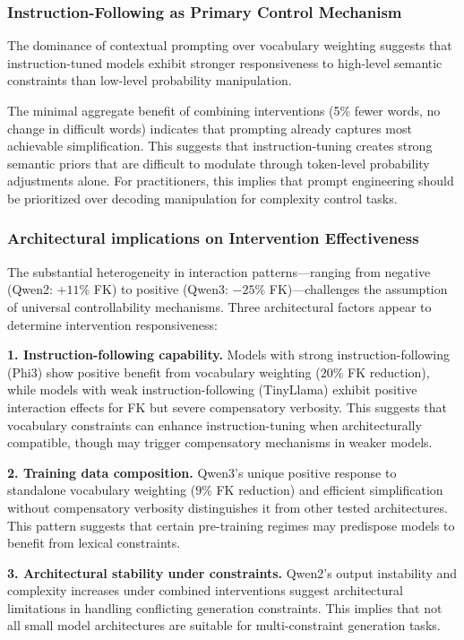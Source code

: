 \documentclass[10pt, a4paper]{article}
\begin{document}
\subsubsection{Instruction-Following as Primary Control Mechanism}

The dominance of contextual prompting over vocabulary weighting suggests that instruction-tuned models exhibit stronger responsiveness to high-level semantic constraints than low-level probability manipulation.

The minimal aggregate benefit of combining interventions (5\% fewer words, no change in difficult words) indicates that prompting already captures most achievable simplification. This suggests that instruction-tuning creates strong semantic priors that are difficult to modulate through token-level probability adjustments alone. For practitioners, this implies that prompt engineering should be prioritized over decoding manipulation for complexity control tasks.

\subsubsection{Architectural implications on Intervention Effectiveness}

The substantial heterogeneity in interaction patterns—ranging from negative (Qwen2: $+11\%$ FK) to positive (Qwen3: $-25\%$ FK)—challenges the assumption of universal controllability mechanisms. Three architectural factors appear to determine intervention responsiveness:

\textbf{1. Instruction-following capability.} Models with strong instruction-following (Phi3) show positive benefit from vocabulary weighting ($20\%$ FK reduction), while models with weak instruction-following (TinyLlama) exhibit positive interaction effects for FK but severe compensatory verbosity. This suggests that vocabulary constraints can enhance instruction-tuning when architecturally compatible, though may trigger compensatory mechanisms in weaker models.

\textbf{2. Training data composition.} Qwen3's unique positive response to standalone vocabulary weighting ($9\%$ FK reduction) and efficient simplification without compensatory verbosity distinguishes it from other tested architectures. This pattern suggests that certain pre-training regimes may predispose models to benefit from lexical constraints.

\textbf{3. Architectural stability under constraints.} Qwen2's output instability and complexity increases under combined interventions suggest architectural limitations in handling conflicting generation constraints. This implies that not all small model architectures are suitable for multi-constraint generation tasks.
\end{document}
